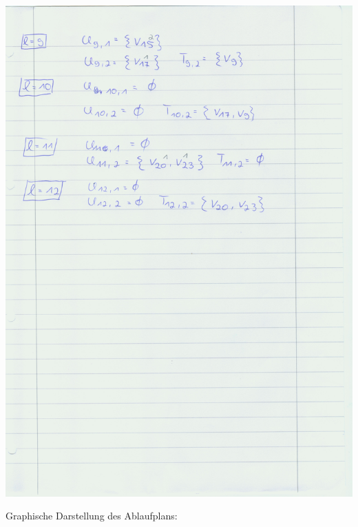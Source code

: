 \documentclass[a4paper]{scrartcl}
\begin{document}
\begin{enumerate}[(a)]
	\includegraphics[scale=0.8]{Image130}
	
	Graphische Darstellung des Ablaufplans:
	

\end{enumerate}
\end{document}
